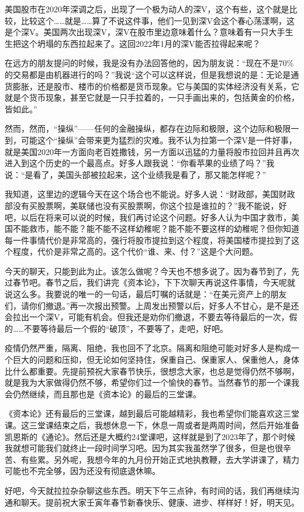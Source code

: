 \documentclass[UTF8, 12pt, a4paper]{ctexrep}
\begin{document}
美国股市在2020年深调之后，出现了一个极为动人的深V，这个有些，这个就是比较，比较这个……就是……算了不说这件事，他们一见到深V会这个春心荡漾啊，这是个深V。美国两次出现深V，深V在股市里边意味着什么？意味着有一只大手生生把这个坍塌的东西拉起来了。这回2022年1月的深V能否拉得起来呢？

在远方的朋友提问的时候，我是没有办法回答他的，因为朋友说：“现在不是70\%的交易都是由机器进行的吗？”我说“这个可以这样说，但是我想说的是：无论是通货膨胀，还是股市、楼市的价格都是货币现象。它与美国的实体经济没有关系，它就是个货币现象，甚至它就是一只手拉着的，一只手画出来的，包括黄金的价格，皆如此。”

然而，然而，“操纵”——任何的金融操纵，都存在边际和极限，这个边际和极限一到，可能这个“操纵”会带来更为猛烈的灾难。我不认为拉第一个深V是一件好事，就是美国2020年一方面向老百姓撒钱，另一方面以迅猛的力量将股市拉回并且再次进入到这个历史的一个最高点。好多人跟我说：“你看苹果的业绩了吗？”我说：“是看了，美国头部被拉起来，这个业绩我是看了，那又能怎样呢？”

我知道，这里边的逻辑今天在这个场合也不能说。好多人说：“财政部，美国财政部没有买股票啊，美联储也没有买股票啊，你这个拉是谁拉的？”我不能说，好吧，以后在将来可以说的时候，我们再讨论这个问题。好多人认为中国才救市，美国不能救市，能不能？能不能不这样幼稚呢？能不能不要这样的幼稚呢？但你知道每一件事情代价是非常高的，强行将股市提拉到这个程度，将美国楼市提拉到了这个程度，代价是非常之高的。这个代价“谁、来、付？”这是个大问题。

今天的聊天，只能到此为止。该怎么做呢？今天也不想多说了。因为春节到了，先过春节吧。春节之后，我们讲完《资本论》，下下次聊天再说这件事情，今天呢就说这么多。我要说的唯一的一句话，最后叮嘱的话就是：“在美元资产上的朋友们，请你们撤退。”再一次报出预警。上周发出预警以后，好多人不甘心，是不是还会拉出一个深V，可能有机会。但我还是劝你们撤退，不要去等待最后的一次，假的……不要等待最后一个假的“破顶”，不要等了，走吧，好吧。

疫情仍然严重，隔离、阻绝，我也回不了北京。隔离和阻绝可能对好多人是构成一个巨大的问题和压抑，但无论如何坚持住，保重自己、保重家人、保重他人，身体比什么都重要。先提前预祝大家春节快乐，很想念大家，也总是觉得仍然不够啊，就是我为大家做得仍然不够，希望你们过一个愉快的春节。当然春节的那一个课我会仍然继续，而且那也是《资本论》的最后的三堂课。

《资本论》还有最后的三堂课，越到最后可能越精彩，我也希望你们能喜欢这三堂课。这三堂课结束之后，我想休息一下，休息一周或者是两周时间，然后开始准备凯恩斯的《通论》。然后还是大概约24堂课吧，这样就是到了2023年了，那个时候我就想可能我们就终止一段时间学习吧。因为其实我虽然学了很多，但是也很辛苦、有些累。另外呢，我想今年的九月份开始正式地执教鞭，去大学讲课了，精力可能也不完全够，因为还没有彻底退休嘛。

好吧，今天就拉拉杂杂聊这些东西。明天下午三点钟，有时间的话，我们再继续沟通和聊天。提前祝大家壬寅年春节新春快乐、健康、进步、样样好！好，明天见。
\end{document}
